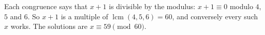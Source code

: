Each congruence says that $x+1$ is divisible by the modulus: $x+1\equiv0$ modulo $4$, $5$ and $6$. So $x+1$ is a multiple of $\operatorname{lcm}(4,5,6)=60$, and conversely every such $x$ works. The solutions are $\boxed{x\equiv59\pmod{60}}$.
